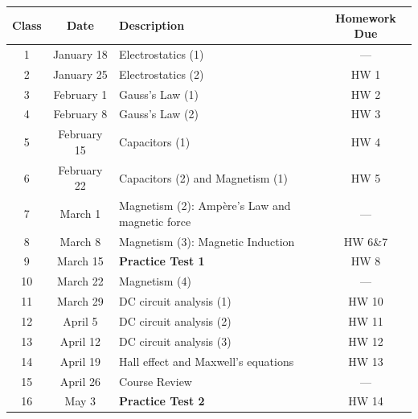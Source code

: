 \documentclass{../../oss-handout}
\begin{document}
\bgroup
\def\arraystretch{1.05}
\vspace{-.2in}
\begin{center}
  \begin{tabular}{|c|c|p{4in}|c|}
    \hline
    \rowcolor{lightgray}
    \textbf{Class} & \textbf{Date} & \textbf{Description} &
    \textbf{Homework Due} \\
    \hline\hline
    1  & January 18  & Electrostatics (1) & --- \\ \hline
    2  & January 25  & Electrostatics (2) & HW 1\\ \hline
    3  & February 1  & Gauss's Law (1)    & HW 2 \\ \hline
    4  & February 8  & Gauss's Law (2)    & HW 3 \\ \hline
    5  & February 15 & Capacitors (1)     & HW 4 \\ \hline
    6  & February 22 & Capacitors (2) and Magnetism (1) & HW 5 \\ \hline
    7  & March 1 & Magnetism (2): Amp\`{e}re's Law and magnetic force & ---
    \\ \hline
    8  & March 8 & Magnetism (3): Magnetic Induction & HW 6\&7 \\ \hline
    \rowcolor{lightgray!50}
    9  & March 15 & \textbf{Practice Test 1} & HW 8 \\ \hline
    10 & March 22 & Magnetism (4)            & ---  \\ \hline
    11 & March 29 & DC circuit analysis (1)  & HW 10 \\ \hline
    12 & April 5  & DC circuit analysis (2)  & HW 11 \\ \hline
    13 & April 12 & DC circuit analysis (3)  & HW 12 \\ \hline
    14 & April 19 & Hall effect and Maxwell's equations & HW 13 \\ \hline
    15 & April 26 & Course Review & --- \\ \hline
    \rowcolor{lightgray!50}
    16 & May 3 & \textbf{Practice Test 2}   & HW 14 \\ \hline

  \end{tabular}
\end{center}
\egroup
\end{document}
